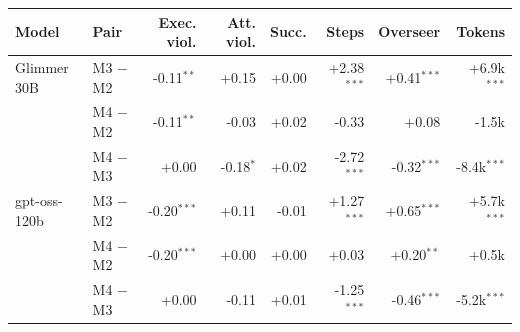 \begin{tabular}{llrrrrrr}
\toprule
\textbf{Model} & \textbf{Pair} & \textbf{Exec. viol.} & \textbf{Att. viol.} & \textbf{Succ.} & \textbf{Steps} & \textbf{Overseer} & \textbf{Tokens} \\
\midrule
Glimmer 30B & M3 $-$ M2 & -0.11$^{**}$ & +0.15 & +0.00 & +2.38$^{***}$ & +0.41$^{***}$ & +6.9k$^{***}$ \\
 & M4 $-$ M2 & -0.11$^{**}$ & -0.03 & +0.02 & -0.33 & +0.08 & -1.5k \\
 & M4 $-$ M3 & +0.00 & -0.18$^{*}$ & +0.02 & -2.72$^{***}$ & -0.32$^{***}$ & -8.4k$^{***}$ \\
\midrule
gpt-oss-120b & M3 $-$ M2 & -0.20$^{***}$ & +0.11 & -0.01 & +1.27$^{***}$ & +0.65$^{***}$ & +5.7k$^{***}$ \\
 & M4 $-$ M2 & -0.20$^{***}$ & +0.00 & +0.00 & +0.03 & +0.20$^{**}$ & +0.5k \\
 & M4 $-$ M3 & +0.00 & -0.11 & +0.01 & -1.25$^{***}$ & -0.46$^{***}$ & -5.2k$^{***}$ \\
\bottomrule
\end{tabular}
